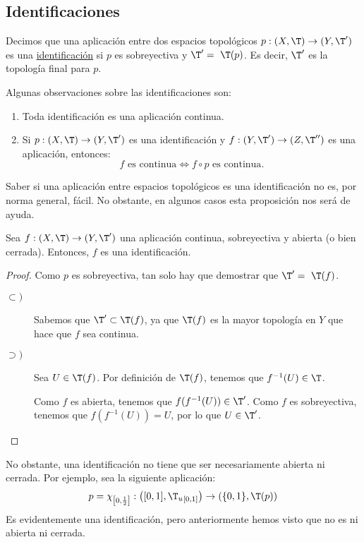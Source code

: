 \subsection{Identificaciones}
\begin{definicion}[Identificación]
    Decimos que una aplicación entre dos espacios topológicos $p:(X,\T)\to (Y,\T')$ es una \ul{identificación} si $p$ es sobreyectiva y $\T'=~\T(p)$. Es decir, $\T'$ es la topología final para $p$.
\end{definicion}

Algunas observaciones sobre las identificaciones son:
\begin{enumerate}
    \item Toda identificación es una aplicación continua.
    \item Si $p:(X,\T)\to (Y,\T')$ es una identificación y $f:(Y,\T')\to (Z,\T'')$ es una aplicación, entonces:
    \begin{equation*}
        f \text{ es continua} \Longleftrightarrow f\circ p \text{ es continua}.
    \end{equation*}
\end{enumerate}

Saber si una aplicación entre espacios topológicos es una identificación no es, por norma general, fácil. No obstante, en algunos casos esta proposición nos será de ayuda.
\begin{prop}\label{prop:ContSobrAbiertaIdentificacion}
    Sea $f:(X,\T)\to (Y,\T')$ una aplicación continua, sobreyectiva y abierta (o bien cerrada). Entonces, $f$ es una identificación.
\end{prop}
\begin{proof}
    Como $p$ es sobreyectiva, tan solo hay que demostrar que $\T'=~\T(f)$.
    \begin{description}
        \item[$\subset)$] Sabemos que $\T'\subset \T(f)$, ya que $\T(f)$ es la mayor topología en $Y$ que hace que $f$ sea continua.
        \item[$\supset)$] Sea $U\in \T(f)$. Por definición de $\T(f)$, tenemos que $f^{-1}(U)\in \T$.
        
        Como $f$ es abierta, tenemos que $f(f^{-1}(U))\in \T'$. Como $f$ es sobreyectiva, tenemos que $f(f^{-1}(U))=U$, por lo que $U\in \T'$.
    \end{description}
\end{proof}

No obstante, una identificación no tiene que ser necesariamente abierta ni cerrada. Por ejemplo, sea la siguiente aplicación:
$$p=\chi_{\left[0,\frac{1}{2}\right]}:\left([0,1],{\T_u}_{[0,1]}\right)\to (\{0,1\}, \T(p))$$
Es evidentemente una identificación, pero anteriormente hemos visto que no es ni abierta ni cerrada.


